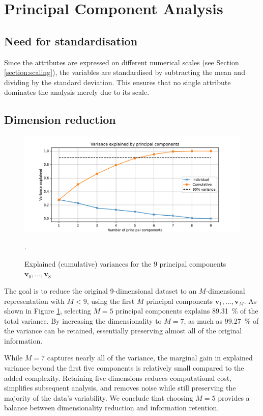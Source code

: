 \documentclass[dtu]{dtuarticle}
\begin{document}
	\section{Principal Component Analysis}

	\label{section:pca}

	\subsection{Need for standardisation}

	Since the attributes are expressed on different numerical scales (see Section \ref{section:scaling}), the variables are standardised by subtracting the mean and dividing by the standard deviation. This ensures that no single attribute dominates the analysis merely due to its scale.

	\subsection{Dimension reduction}

	\begin{figure}
		\includegraphics[width=.9\textwidth]{figures/pca_explained_variance}
		\caption{Explained (cumulative) variances for the 9 principal components $\bm{v}_0,\ldots,\bm{v}_8$}.
		\label{fig:explained-var}
	\end{figure}

	The goal is to reduce the original 9-dimensional dataset to an $M$-dimensional representation with $M < 9$, using the first $M$ principal components $\bm{v}_1,\ldots,\bm{v}_{M}$. As shown in Figure \ref{fig:explained-var}, selecting $M=5$ principal components explains \SI{89.31}{\percent} of the total variance. By increasing the dimensionality to $M=7$, as much as \SI{99.27}{\percent} of the variance can be retained, essentially preserving almost all of the original information.

	While $M=7$ captures nearly all of the variance, the marginal gain in explained variance beyond the first five components is relatively small compared to the added complexity. Retaining five dimensions reduces computational cost, simplifies subsequent analysis, and removes noise while still preserving the majority of the data's variability. We conclude that choosing $M=5$ provides a balance between dimensionality reduction and information retention.
\end{document}
